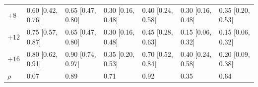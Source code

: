 \begin{tabular}{w{r}{0.6cm} w{r}{1.75cm}w{r}{1.75cm}w{r}{1.75cm}w{r}{1.75cm}w{r}{1.75cm}w{r}{1.75cm}}
$+8$ & 0.60 {\scriptsize[0.42, 0.76]} & 0.65 {\scriptsize[0.47, 0.80]} & 0.30 {\scriptsize[0.16, 0.48]} & 0.40 {\scriptsize[0.24, 0.58]} & 0.30 {\scriptsize[0.16, 0.48]} & 0.35 {\scriptsize[0.20, 0.53]} \\
$+12$ & 0.75 {\scriptsize[0.57, 0.87]} & 0.65 {\scriptsize[0.47, 0.80]} & 0.30 {\scriptsize[0.16, 0.48]} & 0.45 {\scriptsize[0.28, 0.63]} & 0.15 {\scriptsize[0.06, 0.32]} & 0.15 {\scriptsize[0.06, 0.32]} \\
$+16$ & 0.80 {\scriptsize[0.62, 0.91]} & 0.90 {\scriptsize[0.74, 0.97]} & 0.35 {\scriptsize[0.20, 0.53]} & 0.70 {\scriptsize[0.52, 0.84]} & 0.40 {\scriptsize[0.24, 0.58]} & 0.20 {\scriptsize[0.09, 0.38]} \\
\midrule
$\rho$ & 0.07 & 0.89 & 0.71 & 0.92 & 0.35 & 0.64 \\
\bottomrule
\end{tabular}
\\[0.8em]

